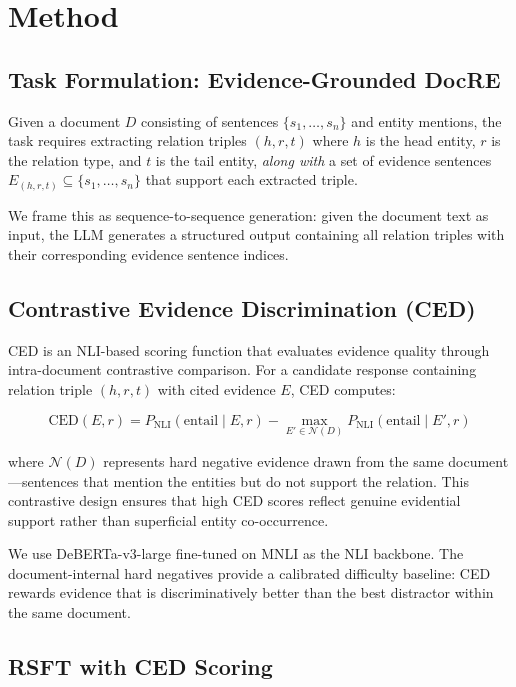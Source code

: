 \documentclass[11pt]{article}
\begin{document}
\section{Method}

\subsection{Task Formulation: Evidence-Grounded DocRE}

Given a document $D$ consisting of sentences $\{s_1, \ldots, s_n\}$ and entity mentions, the task requires extracting relation triples $(h, r, t)$ where $h$ is the head entity, $r$ is the relation type, and $t$ is the tail entity, \emph{along with} a set of evidence sentences $E_{(h,r,t)} \subseteq \{s_1, \ldots, s_n\}$ that support each extracted triple.

We frame this as sequence-to-sequence generation: given the document text as input, the LLM generates a structured output containing all relation triples with their corresponding evidence sentence indices.

\subsection{Contrastive Evidence Discrimination (CED)}

CED is an NLI-based scoring function that evaluates evidence quality through intra-document contrastive comparison. For a candidate response containing relation triple $(h, r, t)$ with cited evidence $E$, CED computes:

\begin{equation}
\text{CED}(E, r) = P_{\text{NLI}}(\text{entail} \mid E, r) - \max_{E' \in \mathcal{N}(D)} P_{\text{NLI}}(\text{entail} \mid E', r)
\end{equation}

where $\mathcal{N}(D)$ represents hard negative evidence drawn from the same document---sentences that mention the entities but do not support the relation. This contrastive design ensures that high CED scores reflect genuine evidential support rather than superficial entity co-occurrence.

We use DeBERTa-v3-large fine-tuned on MNLI as the NLI backbone. The document-internal hard negatives provide a calibrated difficulty baseline: CED rewards evidence that is discriminatively better than the best distractor within the same document.

\subsection{RSFT with CED Scoring}
\end{document}
